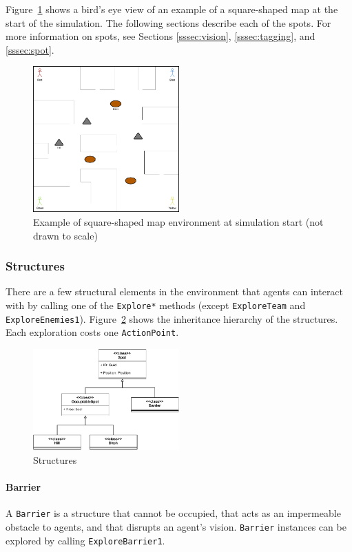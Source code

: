 \documentclass[
  a4paper,
  english,
  DIV=16,
  11pt,
  parskip=half,
  dvipsnames,
  listof=totoc,		     %
  index=totoc,		     %
  bibliography=totoc,	 %
]{scrartcl}
\begin{document}
Figure~\ref{fig:envEx} shows a bird's eye view of an example of a square-shaped map at the start of the simulation. The following sections describe each of the spots. For more information on spots, see Sections \ref{sssec:vision}, \ref{sssec:tagging}, and \ref{sssec:spot}.
%
\begin{figure}[H]
  \centering
  \includegraphics[width=0.5\textwidth, height=0.5\textheight,keepaspectratio]{img/ExampleGameWorldAtSimStart.png}
  \caption{Example of square-shaped map environment at simulation start (not drawn to scale)}
  \label{fig:envEx}
\end{figure}
%
\subsubsection{Structures} \label{sssec:struc}
There are a few structural elements in the environment that agents can interact with by calling one of the \texttt{Explore*} methods (except \texttt{ExploreTeam} and \texttt{ExploreEnemies1}). Figure~\ref*{fig:structures} shows the inheritance hierarchy of the structures. Each exploration costs one \texttt{ActionPoint}.
%
\begin{figure}[H]
    \centering
    \includegraphics[width=0.5\textwidth, height=0.5\textheight,keepaspectratio]{img/lasertag-env-comps.pdf}
    \caption{Structures}
    \label{fig:structures}
\end{figure}
%
\paragraph{Barrier} \label{par:barrierDesc}
A \texttt{Barrier} is a structure that cannot be occupied, that acts as an impermeable obstacle to agents, and that disrupts an agent's vision. \texttt{Barrier} instances can be explored by calling \texttt{ExploreBarrier1}.
%
\end{document}
